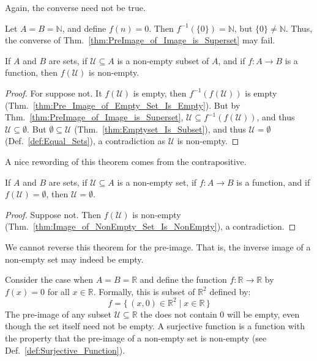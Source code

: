     Again, the converse need not be true.
    \begin{example}
        Let $A=B=\mathbb{N}$, and define $f(n)=0$. Then
        $f^{\minus{1}}(\{0\})=\mathbb{N}$, but $\{0\}\ne\mathbb{N}$. Thus, the
        converse of Thm.~\ref{thm:PreImage_of_Image_is_Superset} may fail.
    \end{example}
    \begin{theorem}
        \label{thm:Image_of_NonEmpty_Set_Is_NonEmpty}%
        If $A$ and $B$ are sets, if $\mathcal{U}\subseteq{A}$ is a non-empty
        subset of $A$, and if $f:A\rightarrow{B}$ is a function, then
        $f(\mathcal{U})$ is non-empty.
    \end{theorem}
    \begin{proof}
        For suppose not. It $f(\mathcal{U})$ is empty, then
        $f^{\minus{1}}(f(\mathcal{U}))$ is empty
        (Thm.~\ref{thm:Pre_Image_of_Empty_Set_Is_Empty}). But by
        Thm.~\ref{thm:PreImage_of_Image_is_Superset},
        $\mathcal{U}\subseteq{f}^{\minus{1}}(f(\mathcal{U}))$, and thus
        $\mathcal{U}\subseteq\emptyset$. But $\emptyset\subseteq\mathcal{U}$
        (Thm.~\ref{thm:Emptyset_Is_Subset}), and thus $\mathcal{U}=\emptyset$
        (Def.~\ref{def:Equal_Sets}), a contradiction as $\mathcal{U}$ is
        non-empty.
    \end{proof}
    A nice rewording of this theorem comes from the contrapositive.
    \begin{theorem}
        If $A$ and $B$ are sets, if $\mathcal{U}\subseteq{A}$ is a non-empty
        set, if $f:A\rightarrow{B}$ is a function, and if
        $f(\mathcal{U})=\emptyset$, then $\mathcal{U}=\emptyset$.
    \end{theorem}
    \begin{proof}
        Suppose not. Then $f(\mathcal{U})$ is non-empty
        (Thm.~\ref{thm:Image_of_NonEmpty_Set_Is_NonEmpty}), a contradiction.
    \end{proof}
    We cannot reverse this theorem for the pre-image. That is, the inverse image
    of a non-empty set may indeed be empty.
    \begin{example}
        Consider the case when $A=B=\mathbb{R}$ and define the function
        $f:\mathbb{R}\rightarrow\mathbb{R}$ by $f(x)=0$ for all
        $x\in\mathbb{R}$. Formally, this is subset of $\mathbb{R}^{2}$ defined
        by:
        \begin{equation}
            f=\big\{\,(x,0)\in\mathbb{R}^{2}\;|\;x\in\mathbb{R}\,\big\}
        \end{equation}
        The pre-image of any subset $\mathcal{U}\subseteq\mathbb{R}$ the does
        not contain 0 will be empty, even though the set itself need not be
        empty. A surjective function is a function with the property that the
        pre-image of a non-empty set is non-empty
        (see Def.~\ref{def:Surjective_Function}).
    \end{example}
